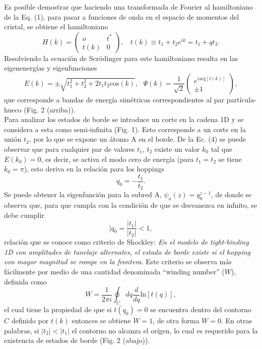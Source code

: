 \documentclass{article}
\begin{document}
Es posible demostrar que haciendo una transformada de Fourier al hamiltoniano de la Eq. (1), para pasar a funciones de onda en el espacio de momentos del cristal, se obtiene el hamiltoniano
\begin{equation}
    H(k)= \begin{pmatrix}
    o & t^{*}\\
    t(k) & 0
    \end{pmatrix}, \ \ \ \ t(k)\equiv t_1 + t_2 e^{ik} = t_1 + qt_2.
\end{equation}
Resolviendo la ecuación de Scr\"odinger para este hamiltoniano resulta en las eigenenergías y eigenfunciones
\begin{equation}
    E(k)= \pm \sqrt{t_1^2 + t_2^2 + 2t_1 t_2\mathrm{cos}(k)},\ \ \ \Psi(k) = \frac{1}{\sqrt{2}}
    \begin{pmatrix}
    e^{i\mathrm{arg}[t(k)]} \\
    \pm 1
    \end{pmatrix},
\end{equation}
que corresponde a bandas de energía simétricas correspondientes al par partícula-hueco (Fig. 2 (arriba)).\\

Para analizar los estados de borde se introduce un corte en la cadena 1D y se considera a esta como semi-infinita (Fig. 1). Esto corresponde a un corte en la unión $t_2$, por lo que se expone un átomo A en el borde. De la Ec. (4) se puede observar que para cualquier par de valores $t_1$, $t_2$ existe un valor $k_0$ tal que $E(k_0)=0$, es decir, se activa el modo cero de energía (para $t_1=t_2$ se tiene $k_0=\pi$), esto deriva en la relación para los hoppings
\begin{equation}
    q_0=-\frac{t_1}{t_2}.
\end{equation}
Se puede obtener la eigenfunción para la subred A, $\psi_a(z)=q_0^{z-1}$, de donde se observa que, para que cumpla con la condición de que se desvanezca en infnito, se debe cumplir
\begin{equation}
|q_0=\frac{|t_1|}{|t_2|} < 1,
\end{equation}
relación que se conoce como criterio de Shockley: \textit{En el modelo de tight-binding 1D con amplitudes de tunelaje alternates, el estado de borde existe si el hopping con mayor magnitud se rompe en la frontera}. Este criterio se observa más fácilmente por medio de una cantidad denominada ``winding number'' ($W$), definida como
\begin{equation}
    W= \frac{1}{2\pi i} \oint_C dq \frac{d}{dq} \mathrm{ln} [t(q)],
\end{equation}
el cual tiene la propiedad de que si $t(q_0)=0$ se encuentra dentro del contorno $C$ definido por $t(k)$ entonces se obtiene $W=1$, de otra forma $W=0$. En otras palabras, si $|t_2|< |t_1|$ el contorno no alcanza el orígen, lo cual es requerido para la existencia de estados de borde (Fig. 2 (abajo)).\\
\end{document}

